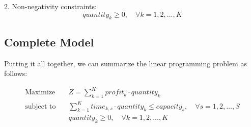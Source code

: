 \documentclass{article}
\begin{document}
2. Non-negativity constraints:
\[
quantity_{k} \geq 0, \quad \forall k = 1, 2, \ldots, K
\]

\subsection*{Complete Model}
Putting it all together, we can summarize the linear programming problem as follows:

\begin{align*}
\text{Maximize} \quad & Z = \sum_{k=1}^{K} profit_{k} \cdot quantity_{k} \\
\text{subject to} \quad & \sum_{k=1}^{K} time_{k, s} \cdot quantity_{k} \leq capacity_{s}, \quad \forall s = 1, 2, \ldots, S \\
& quantity_{k} \geq 0, \quad \forall k = 1, 2, \ldots, K
\end{align*}
\end{document}
